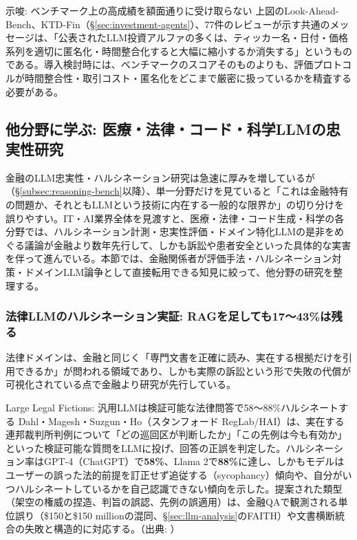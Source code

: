 \begin{insight}{示唆: ベンチマーク上の高成績を額面通りに受け取らない}
上図のLook-Ahead-Bench、KTD-Fin（\S\ref{sec:investment-agents}）、77件のレビューが示す共通のメッセージは、「公表されたLLM投資アルファの多くは、ティッカー名・日付・価格系列を適切に匿名化・時間整合化すると大幅に縮小するか消失する」というものである。導入検討時には、ベンチマークのスコアそのものよりも、評価プロトコルが時間整合性・取引コスト・匿名化をどこまで厳密に扱っているかを精査する必要がある。
\end{insight}

\subsection{他分野に学ぶ: 医療・法律・コード・科学LLMの忠実性研究}
\label{subsec:cross-domain-hallucination}

金融のLLM忠実性・ハルシネーション研究は急速に厚みを増しているが（\S\ref{subsec:reasoning-bench}以降）、単一分野だけを見ていると「これは金融特有の問題か、それともLLMという技術に内在する一般的な限界か」の切り分けを誤りやすい。IT・AI業界全体を見渡すと、医療・法律・コード生成・科学の各分野では、ハルシネーション計測・忠実性評価・ドメイン特化LLMの是非をめぐる議論が金融より数年先行して、しかも訴訟や患者安全といった具体的な実害を伴って進んでいる。本節では、金融関係者が評価手法・ハルシネーション対策・ドメインLLM論争として直接転用できる知見に絞って、他分野の研究を整理する。

\subsubsection{法律LLMのハルシネーション実証: RAGを足しても17〜43\%は残る}

法律ドメインは、金融と同じく「専門文書を正確に読み、実在する根拠だけを引用できるか」が問われる領域であり、しかも実際の訴訟という形で失敗の代償が可視化されている点で金融より研究が先行している。

\begin{casestudy}{Large Legal Fictions: 汎用LLMは検証可能な法律問答で58〜88\%ハルシネートする}
Dahl・Magesh・Suzgun・Ho（スタンフォード RegLab/HAI）は、実在する連邦裁判所判例について「どの巡回区が判断したか」「この先例は今も有効か」といった検証可能な質問をLLMに投げ、回答の正誤を判定した。ハルシネーション率はGPT-4（ChatGPT）で\textbf{58\%}、Llama 2で\textbf{88\%}に達し、しかもモデルはユーザーの誤った法的前提を訂正せず追従する（sycophancy）傾向や、自分がいつハルシネートしているかを自己認識できない傾向を示した。提案された類型（架空の権威の捏造、判旨の誤認、先例の誤適用）は、金融QAで観測される単位誤り（\$150と\$150 millionの混同、\S\ref{sec:llm-analysis}のFAITH）や文書横断統合の失敗と構造的に対応する。（出典: \cite{y05dahl2024legalfictions}）
\end{casestudy}

